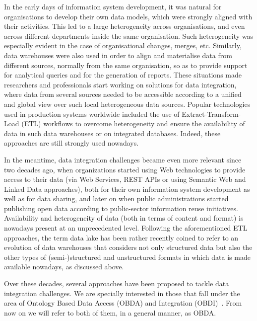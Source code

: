 In the early days of information system development, it was natural for organisations to develop their own data models, which were strongly aligned with their activities. This led to a large heterogeneity across organisations, and even across different departments inside the same organisation. Such heterogeneity was especially evident in the case of organisational changes, merges, etc. Similarly, data warehouses were also used in order to align and materialise data from different sources, normally from the same organisation, so as to provide support for analytical queries and for the generation of reports. These situations made researchers and professionals start working on solutions for data integration, where data from several sources needed to be accessible according to a unified and global view over such local heterogeneous data sources. Popular technologies used in production systems worldwide included the use of Extract-Transform-Load (ETL) workflows to overcome heterogeneity and ensure the availability of data in such data warehouses or on integrated databases. Indeed, these approaches are still strongly used nowadays.

In the meantime, data integration challenges became even more relevant since two decades ago, when organizations started using Web technologies to provide access to their data (via Web Services, REST APIs or using Semantic Web and Linked Data approaches), both for their own information system development as well as for data sharing, and later on when public administrations started publishing open data according to  public-sector information reuse initiatives. Availability and heterogeneity of data (both in terms of content and format) is nowadays present at an unprecedented level. Following the aforementioned ETL approaches, the term data lake has been rather recently coined to refer to an evolution of data warehouses that considers not only structured data but also the other types of (semi-)structured and unstructured formats in which data is made available nowadays, as discussed above.

Over these decades, several approaches have been proposed to tackle data integration challenges. We are specially interested in those that fall under the area of Ontology Based Data Access (OBDA) and Integration (OBDI)~\citep{poggi2008linking}. From now on we will refer to both of them, in a general manner, as OBDA. 

